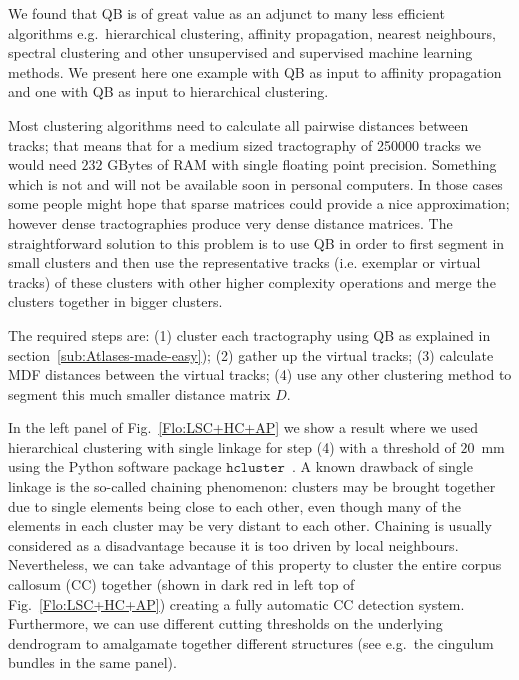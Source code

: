 \documentclass{bioinfo}
\begin{document}
We found that QB is of great value as an adjunct to many less efficient
algorithms e.g.~hierarchical clustering, affinity propagation, nearest
neighbours, spectral clustering and other unsupervised and supervised
machine learning methods. We present here one example with QB as input to
affinity propagation and one with QB as input to hierarchical
clustering.

Most clustering algorithms need to calculate all pairwise distances
between tracks; that means that for a medium sized tractography of
\num{250000} tracks we would need $232$ GBytes of RAM with single floating
point precision. Something which is not and will not be available soon
in personal computers. In those cases some people might hope that sparse
matrices could provide a nice approximation; however dense
tractographies produce very dense distance matrices. The straightforward
solution to this problem is to use QB in order to first segment in small
clusters and then use the representative tracks (i.e. exemplar or virtual
tracks) of these clusters with other higher complexity operations and merge the
clusters together in bigger clusters.

The required steps are: (1) cluster each tractography using QB as
explained in section~\ref{sub:Atlases-made-easy}); (2) gather up the
virtual tracks; (3) calculate MDF distances between the virtual tracks;
(4) use any other clustering method to segment this much smaller
distance matrix $D$.

In the left panel of Fig.~\ref{Flo:LSC+HC+AP} we show a result where we
used hierarchical clustering with single linkage for step (4) with a
threshold of $20$~mm using the Python software package
$\texttt{hcluster}$~\cite{eads-hcluster-software}. A known drawback of
single linkage is the so-called chaining phenomenon: clusters may be
brought together due to single elements being close to each other, even
though many of the elements in each cluster may be very distant to each
other. Chaining is usually considered as a disadvantage because it is
too driven by local neighbours. Nevertheless, we can take advantage of this
property to cluster the entire corpus callosum (CC) together (shown in
dark red in left top of Fig.~\ref{Flo:LSC+HC+AP}) creating a fully
automatic CC detection system.  Furthermore, we can use different
cutting thresholds on the underlying dendrogram to amalgamate together
different structures (see e.g.~the cingulum bundles in the same panel).
\end{document}
